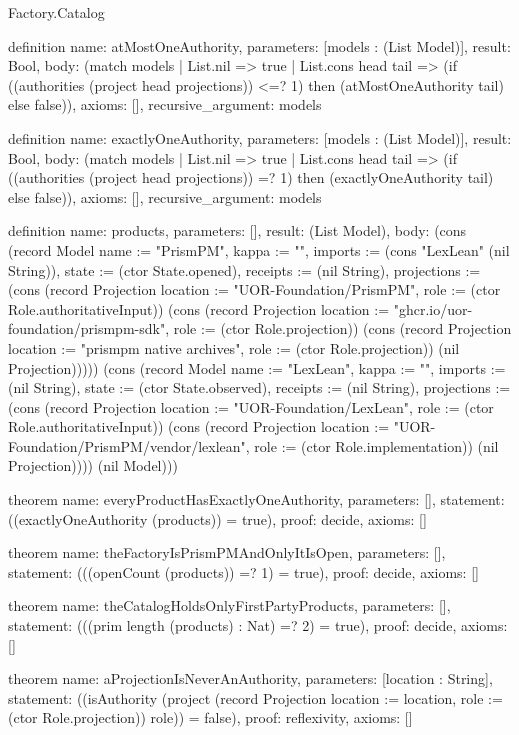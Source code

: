 \begin{lexlean}{Factory.Catalog}
\begin{semanticmodule}
definition{
  name: atMostOneAuthority,
  parameters: [models : (List Model)],
  result: Bool,
  body: (match models
    | List.nil => true
    | List.cons head tail => (if ((authorities (project head projections)) <=? 1) then (atMostOneAuthority tail) else false)),
  axioms: [],
  recursive_argument: models
}

definition{
  name: exactlyOneAuthority,
  parameters: [models : (List Model)],
  result: Bool,
  body: (match models
    | List.nil => true
    | List.cons head tail => (if ((authorities (project head projections)) =? 1) then (exactlyOneAuthority tail) else false)),
  axioms: [],
  recursive_argument: models
}

definition{
  name: products,
  parameters: [],
  result: (List Model),
  body: (cons (record Model {name := "PrismPM", kappa := "", imports := (cons "LexLean" (nil String)), state := (ctor State.opened), receipts := (nil String), projections := (cons (record Projection {location := "UOR-Foundation/PrismPM", role := (ctor Role.authoritativeInput)}) (cons (record Projection {location := "ghcr.io/uor-foundation/prismpm-sdk", role := (ctor Role.projection)}) (cons (record Projection {location := "prismpm native archives", role := (ctor Role.projection)}) (nil Projection))))}) (cons (record Model {name := "LexLean", kappa := "", imports := (nil String), state := (ctor State.observed), receipts := (nil String), projections := (cons (record Projection {location := "UOR-Foundation/LexLean", role := (ctor Role.authoritativeInput)}) (cons (record Projection {location := "UOR-Foundation/PrismPM/vendor/lexlean", role := (ctor Role.implementation)}) (nil Projection)))}) (nil Model)))
}

theorem{
  name: everyProductHasExactlyOneAuthority,
  parameters: [],
  statement: ((exactlyOneAuthority (products)) = true),
  proof: decide{},
  axioms: []
}

theorem{
  name: theFactoryIsPrismPMAndOnlyItIsOpen,
  parameters: [],
  statement: (((openCount (products)) =? 1) = true),
  proof: decide{},
  axioms: []
}

theorem{
  name: theCatalogHoldsOnlyFirstPartyProducts,
  parameters: [],
  statement: (((prim length (products) : Nat) =? 2) = true),
  proof: decide{},
  axioms: []
}

theorem{
  name: aProjectionIsNeverAnAuthority,
  parameters: [location : String],
  statement: ((isAuthority (project (record Projection {location := location, role := (ctor Role.projection)}) role)) = false),
  proof: reflexivity{},
  axioms: []
}
\end{semanticmodule}
\end{lexlean}

